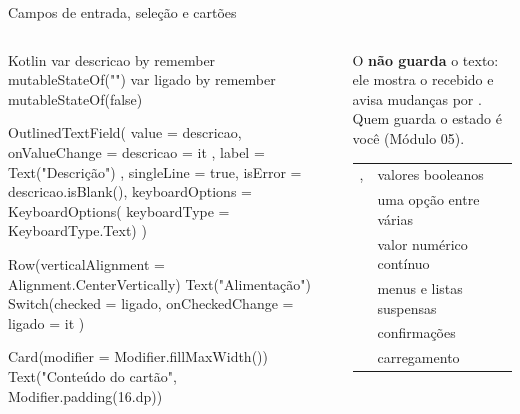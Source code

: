 \documentclass[aspectratio=169,10pt]{beamer}
\begin{document}
\begin{frame}[fragile]{Campos de entrada, seleção e cartões}
  \begin{columns}[T]
    \begin{column}{0.54\textwidth}
\begin{codigo}[title=Entrada de dados]{Kotlin}
var descricao by remember { mutableStateOf("") }
var ligado by remember { mutableStateOf(false) }

OutlinedTextField(
  value = descricao,
  onValueChange = { descricao = it },
  label = { Text("Descrição") },
  singleLine = true,
  isError = descricao.isBlank(),
  keyboardOptions = KeyboardOptions(
    keyboardType = KeyboardType.Text)
)

Row(verticalAlignment = Alignment.CenterVertically) {
  Text("Alimentação")
  Switch(checked = ligado, onCheckedChange = { ligado = it })
}

Card(modifier = Modifier.fillMaxWidth()) {
  Text("Conteúdo do cartão", Modifier.padding(16.dp))
}
\end{codigo}
    \end{column}
    \begin{column}{0.44\textwidth}
      \begin{conceito}
        O  \textbf{não guarda} o texto: ele mostra o  recebido e avisa mudanças por . Quem guarda o estado é você (Módulo 05).
      \end{conceito}
      \scriptsize
      \begin{tabularx}{\linewidth}{@{}l L@{}}
        \toprule
         &  \\
        \midrule
        ,  & valores booleanos \\
         & uma opção entre várias \\
         & valor numérico contínuo \\
         & menus e listas suspensas \\
         & confirmações \\
         & carregamento \\
        \bottomrule
      \end{tabularx}
    \end{column}
  \end{columns}
\end{frame}
\end{document}
